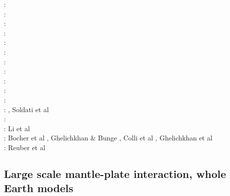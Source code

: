\begin{scriptsize}
\nineteenninetyeight: \cite{cava98}\\
\nineteenninetynine: \cite{samb99}\cite{samb99b}\\
\twothousandone: \cite{bomo01}\cite{kapo01}\\
\twothousandtwo: \cite{shri02}\cite{burb02}\\
\twothousandthree: \cite{buht03}\\
\twothousandfour: \cite{isst04}\\
\twothousandseven: \cite{isks07}\\
\twothousandeight: \cite{splg08}\cite{ligu08}\\
\twothousandnine: \cite{wama09}\cite{splg09}\cite{sifg09}\\
\twothousandtwelve: \cite{naco12}\\
\twothousandfourteen: \cite{wosp14}\cite{hobo14}\cite{licl14}\\
\twothousandfifteen: \cite{wahg15}\cite{cobs15}\cite{vybu15}, Soldati et al \cite{sobd15}\\
\twothousandsixteen: \cite{ghbu16}\cite{bocf16}\cite{yagu16}\cite{baum16}\cite{pric16}\\
\twothousandseventeen: Li et al \cite{ligs17}\\
\twothousandeighteen: Bocher et al \cite{bofc18}, Ghelichkhan \& Bunge \cite{ghbu18}, Colli et al \cite{cogb18}, Ghelichkhan et al \cite{ghmc18}\\
\twothousandtwenty: Reuber et al \cite{rehp20}
\end{scriptsize}

\subsection{Large scale mantle-plate interaction, whole Earth models}

\cite{yufl85}
\cite{loja95}
\cite{coli06}
\cite{wamg10}\cite{golw00}\cite{stgb10}\cite{cobe10}
\cite{algs12}\cite{roct12}\cite{crtm12}
\cite{ghbh13}\cite{yahb13}
\cite{macs16}
\cite{hulz18}\cite{osss18b}

